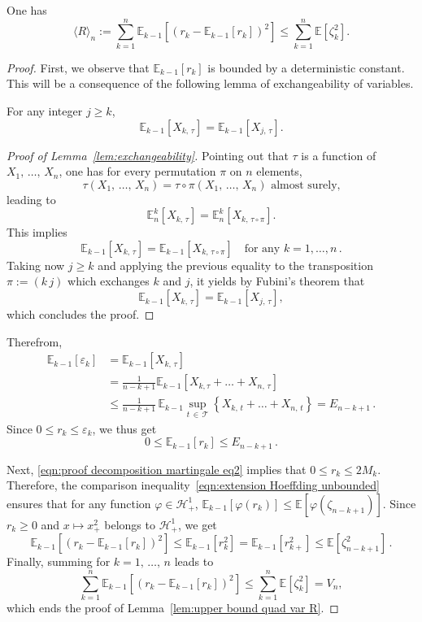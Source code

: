 \documentclass[AHL,Unicode,longabstracts,published]{cedram}
\newcommand{\bE}{\mathbb{E}}
\newcommand{\cH}{\mathcal{H}}
\newcommand{\cT}{\mathcal{T}}
\begin{document}
\begin{lemm}\label{lem:upper bound quad var R}
One has
\[
\langle R \rangle_n:=\sum_{k=1}^n\bE_{k-1}\left[\left(r_k-\bE_{k-1}[r_k]\right)^2\right]\leq\sum_{k=1}^n \bE\left[\zeta_{k}^2\right].
\]
\end{lemm}


\begin{proof}
First, we observe that $\bE_{k-1}[r_k]$ is bounded by a deterministic constant. This will be a consequence of the following lemma of exchangeability of variables.


\begin{lemm}\label{lem:exchangeability}
For any integer $j\geq k$,
\[
\bE_{k-1}\left[X_{k,\,\tau}\right]=\bE_{k-1}\left[X_{j,\,\tau}\right].
\]
\end{lemm}


\begin{proof}[Proof of Lemma~\ref{lem:exchangeability}]
Pointing out that $\tau$ is a function of $X_1,\,\ldots,\,X_n$, one has for every permutation $\pi$ on $n$ elements,
\[
\tau(X_1,\,\ldots,\,X_n)=\tau\circ\pi(X_1,\,\ldots,\,X_n) \text{ almost surely,}
\]
leading to
\[
\bE_n^k[X_{k,\,\tau}]=\bE_n^k[X_{k,\,\tau\circ\pi}].
\]
This implies
\[
\bE_{k-1}[X_{k,\,\tau}]=\bE_{k-1}[X_{k,\,\tau\circ\pi}]\quad \text{for any }k=1,\ldots,n\,.
\]
Taking now $j\geq k$ and applying the previous equality to the transposition $\pi:=(k\,j)$ which exchanges $k$ and $j$, it yields by Fubini's theorem that
\[
\bE_{k-1}\left[X_{k,\,\tau}\right]=\bE_{k-1}\left[X_{j,\,\tau}\right],
\]
which concludes the proof.
\end{proof}

Therefrom,
\begin{equation}
\begin{aligned}
\bE_{k-1}[\varepsilon_k] &= \bE_{k-1}[X_{k,\,\tau}]\\
&=\frac{1}{n-k+1} \bE_{k-1}\left[X_{k,\tau}+\ldots+X_{n,\,\tau}\right]\\
&\leq \frac{1}{n-k+1} \,\bE_{k-1}\sup_{t\,\in\,\cT}\left\{X_{k,\,t}+\ldots + X_{n,\,t}\right\}=E_{n-k+1}\,.
\end{aligned}
\end{equation}
Since $0\leq r_k\leq\varepsilon_k$, we thus get
\[
0\leq \bE_{k-1}[r_k]\leq E_{n-k+1}\,.
\]

Next, \eqref{eqn:proof decomposition martingale eq2} implies that $0\leq r_k\leq 2M_k$. Therefore, the comparison inequality~\eqref{eqn:extension Hoeffding unbounded} ensures that for any function $\varphi\in\cH_+^1$, $\bE_{k-1}[\varphi(r_k)]\leq\bE[\varphi(\zeta_{n-k+1})]$. Since $r_k\geq0$ and $x\mapsto x_+^2$ belongs to $\cH_+^1$, we get
\[
\bE_{k-1}\left[\left(r_k-\bE_{k-1}[r_k]\right)^2\right]\leq\bE_{k-1}\left[r_k^2\right]=\bE_{k-1}\left[r_{k+}^2\right] \leq \bE\left[\zeta_{n-k+1}^2\right]\,.
\]
Finally, summing for $k=1,\,\ldots,\,n$ leads to
\begin{equation}\label{eqn:bound quad var R}
\sum_{k=1}^n\bE_{k-1}\left[\left(r_k-\bE_{k-1}[r_k]\right)^2\right] \leq \sum_{k=1}^n\bE\left[\zeta_k^2\right]=V_n,
\end{equation}
which ends the proof of Lemma~\ref{lem:upper bound quad var R}.
\end{proof}
\end{document}
